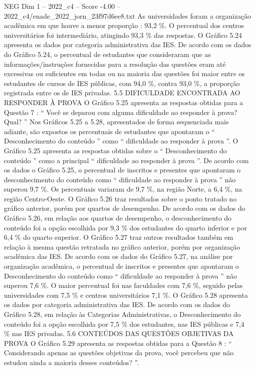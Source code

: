 \begin{textsample}{NEG Dim 1 – 2022\_c4 – Score -4.00 – 2022\_c4/enade\_2022\_jorn\_23f97d6ee8.txt}
As universidades foram a organização acadêmica em que houve a menor proporção : 93,2 \%.
O percentual dos centros universitários foi intermediário, atingindo 93,3 \% das respostas.
O Gráfico 5.24 apresenta os dados por categoria administrativa das IES.
De acordo com os dados do Gráfico 5.24, o percentual de estudantes que consideraram que as informações/instruções fornecidas para a resolução das questões eram até excessivas ou suficientes em todas ou na maioria das questões foi maior entre os estudantes de cursos de IES públicas, com 94,0 \%, contra 93,0 \%, a proporção registrada entre os de IES privadas. 5.5 DIFICULDADE ENCONTRADA AO RESPONDER À PROVA O Gráfico 5.25 apresenta as respostas obtidas para a Questão 7 : “ Você se deparou com alguma dificuldade ao responder à prova?
Qual? ” Nos Gráficos 5.25 a 5.28, apresentados de forma sequenciada mais adiante, são expostos os percentuais de estudantes que apontaram o “ Desconhecimento do conteúdo ” como “ dificuldade ao responder à prova ”.
O Gráfico 5.25 apresenta as respostas obtidas sobre o “ Desconhecimento do conteúdo ” como a principal “ dificuldade ao responder à prova ”.
De acordo com os dados o Gráfico 5.25, o percentual de inscritos e presentes que apontaram o desconhecimento do conteúdo como “ dificuldade ao responder à prova ” não superou 9,7 \%.
Os percentuais variaram de 9,7 \%, na região Norte, a 6,4 \%, na região Centro-Oeste.
O Gráfico 5.26 traz resultados sobre o ponto tratado no gráfico anterior, porém por quartos de desempenho.
De acordo com os dados do Gráfico 5.26, em relação aos quartos de desempenho, o desconhecimento do conteúdo foi a opção escolhida por 9,3 \% dos estudantes do quarto inferior e por 6,4 \% do quarto superior.
O Gráfico 5.27 traz outros resultados também em relação à mesma questão retratada no gráfico anterior, porém por organização acadêmica das IES.
De acordo com os dados do Gráfico 5.27, na análise por organização acadêmica, o percentual de inscritos e presentes que apontaram o Desconhecimento do conteúdo como “ dificuldade ao responder à prova ” não superou 7,6 \%.
O maior percentual foi nas faculdades com 7,6 \%, seguido pelas universidades com 7,5 \% e centros universitários 7,1 \%.
O Gráfico 5.28 apresenta os dados por categoria administrativa das IES.
De acordo com os dados do Gráfico 5.28, em relação às Categorias Administrativas, o Desconhecimento do conteúdo foi a opção escolhida por 7,5 \% dos estudantes, nas IES públicas e 7,4 \% nas IES privadas. 5.6 CONTEÚDOS DAS QUESTÕES OBJETIVAS DA PROVA O Gráfico 5.29 apresenta as respostas obtidas para a Questão 8 : “ Considerando apenas as questões objetivas da prova, você percebeu que não estudou ainda a maioria desses conteúdos? ”.

\end{textsample}
